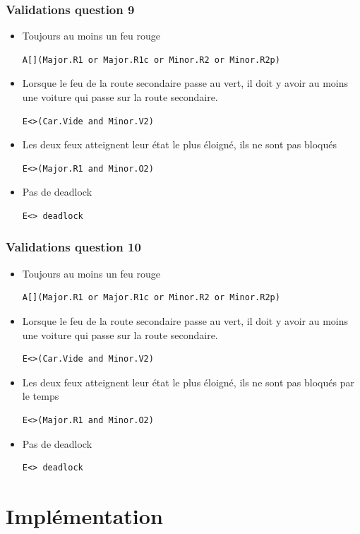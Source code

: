 \documentclass[11pt]{article}
\begin{document}
\subsubsection{Validations question 9}

\begin{itemize}
	\item Toujours au moins un feu rouge
\begin{verbatim}
A[](Major.R1 or Major.R1c or Minor.R2 or Minor.R2p)
\end{verbatim}
	
	\item Lorsque le feu de la route secondaire passe au vert, il doit y avoir au moins une voiture qui passe sur la route secondaire.
\begin{verbatim}
E<>(Car.Vide and Minor.V2)
\end{verbatim}
	
	\item Les deux feux atteignent leur état le plus éloigné, ils ne sont pas bloqués
\begin{verbatim}
E<>(Major.R1 and Minor.O2)
\end{verbatim}
	
	\item Pas de deadlock
\begin{verbatim}
E<> deadlock
\end{verbatim}

\end{itemize}

\subsubsection{Validations question 10}

\begin{itemize}
	\item Toujours au moins un feu rouge
\begin{verbatim}
A[](Major.R1 or Major.R1c or Minor.R2 or Minor.R2p)
\end{verbatim}

	\item Lorsque le feu de la route secondaire passe au vert, il doit y avoir au moins une voiture qui passe sur la route secondaire.
\begin{verbatim}
E<>(Car.Vide and Minor.V2)
\end{verbatim}

	\item Les deux feux atteignent leur état le plus éloigné, ils ne sont pas bloqués par le temps
\begin{verbatim}
E<>(Major.R1 and Minor.O2)
\end{verbatim}

	\item Pas de deadlock
\begin{verbatim}
E<> deadlock
\end{verbatim}
\end{itemize}

\section{Implémentation}
\end{document}
